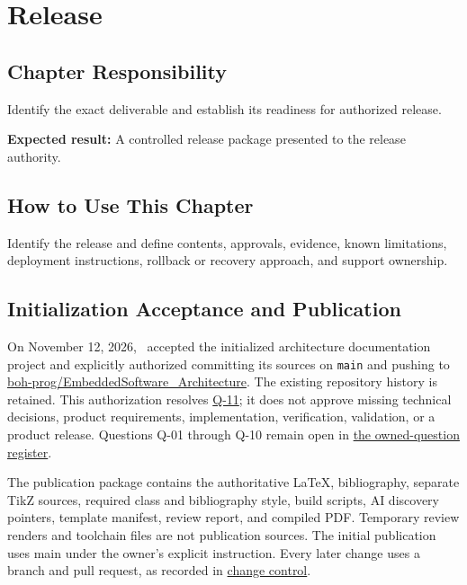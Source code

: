 \chapter{Release}
\section{Chapter Responsibility}
\label{Section:ReleaseResponsibility}
Identify the exact deliverable and establish its readiness for authorized release.

\noindent\textbf{Expected result:} A controlled release package presented to the release authority.

\section{How to Use This Chapter}
Identify the release and define contents, approvals, evidence, known limitations, deployment instructions, rollback or recovery approach, and support ownership.

\section{Initialization Acceptance and Publication}
\label{Section:InitializationPublication}
On November 12, 2026, \DocumentOwner\ accepted the initialized architecture
documentation project and explicitly authorized committing its sources on
\texttt{main} and pushing to
\href{https://github.com/boh-prog/EmbeddedSoftware_Architecture.git}{boh-prog/EmbeddedSoftware\_Architecture}.
The existing repository history is retained. This authorization resolves
\hyperref[Question:Q-11]{Q-11}; it does not approve missing technical decisions,
product requirements, implementation, verification, validation, or a product
release. Questions Q-01 through Q-10 remain open in
\hyperref[Section:OwnedQuestions]{the owned-question register}.

The publication package contains the authoritative LaTeX, bibliography,
separate TikZ sources, required class and bibliography style, build scripts,
AI discovery pointers, template manifest, review report, and compiled PDF.
Temporary review renders and toolchain files are not publication sources.
The initial publication uses main under the owner's explicit instruction.
Every later change uses a branch and pull request, as recorded in
\hyperref[Section:ProjectChangeControl]{change control}.
